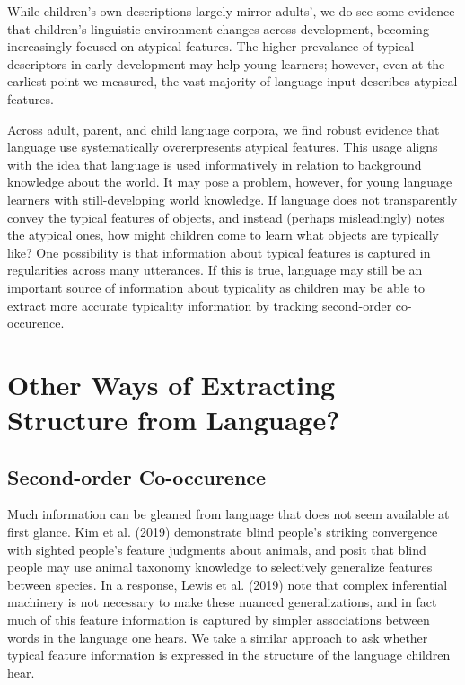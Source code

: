 \documentclass[10pt, letterpaper]{article}
\begin{document}
While children's own descriptions largely mirror adults', we do see some
evidence that children's linguistic environment changes across
development, becoming increasingly focused on atypical features. The
higher prevalance of typical descriptors in early development may help
young learners; however, even at the earliest point we measured, the
vast majority of language input describes atypical features.

Across adult, parent, and child language corpora, we find robust
evidence that language use systematically overerpresents atypical
features. This usage aligns with the idea that language is used
informatively in relation to background knowledge about the world. It
may pose a problem, however, for young language learners with
still-developing world knowledge. If language does not transparently
convey the typical features of objects, and instead (perhaps
misleadingly) notes the atypical ones, how might children come to learn
what objects are typically like? One possibility is that information
about typical features is captured in regularities across many
utterances. If this is true, language may still be an important source
of information about typicality as children may be able to extract more
accurate typicality information by tracking second-order co-occurence.

\hypertarget{other-ways-of-extracting-structure-from-language}{%
\section{Other Ways of Extracting Structure from
Language?}\label{other-ways-of-extracting-structure-from-language}}

\hypertarget{second-order-co-occurence}{%
\subsection{Second-order Co-occurence}\label{second-order-co-occurence}}

Much information can be gleaned from language that does not seem
available at first glance. Kim et al. (2019) demonstrate blind people's
striking convergence with sighted people's feature judgments about
animals, and posit that blind people may use animal taxonomy knowledge
to selectively generalize features between species. In a response, Lewis
et al. (2019) note that complex inferential machinery is not necessary
to make these nuanced generalizations, and in fact much of this feature
information is captured by simpler associations between words in the
language one hears. We take a similar approach to ask whether typical
feature information is expressed in the structure of the language
children hear.
\end{document}
